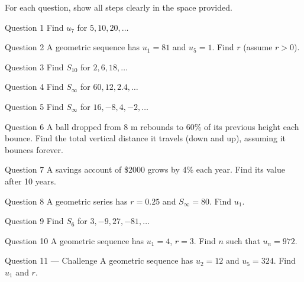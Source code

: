 \documentclass[11pt]{article}
\begin{document}
\clearpage
{}
For each question, show all steps clearly in the space provided.

\begin{qbox}{Question 1}
Find $u_7$ for $5,10,20,\dots$\workspace{2.4cm}
\end{qbox}

\begin{qbox}{Question 2}
A geometric sequence has $u_1=81$ and $u_5=1$. Find $r$ (assume $r>0$).\workspace{2.4cm}
\end{qbox}

\begin{qbox}{Question 3}
Find $S_{10}$ for $2,6,18,\dots$\workspace{2.4cm}
\end{qbox}

\begin{qbox}{Question 4}
Find $S_\infty$ for $60,12,2.4,\dots$\workspace{2.4cm}
\end{qbox}

\begin{qbox}{Question 5}
Find $S_\infty$ for $16,-8,4,-2,\dots$\workspace{2.4cm}
\end{qbox}

\begin{qbox}{Question 6}
A ball dropped from 8 m rebounds to 60\% of its previous height each bounce. Find the total vertical distance it travels (down and up), assuming it bounces forever.\workspace{2.4cm}
\end{qbox}

\begin{qbox}{Question 7}
A savings account of \$2000 grows by 4\% each year. Find its value after 10 years.\workspace{2.4cm}
\end{qbox}

\begin{qbox}{Question 8}
A geometric series has $r=0.25$ and $S_\infty=80$. Find $u_1$.\workspace{2.4cm}
\end{qbox}

\begin{qbox}{Question 9}
Find $S_6$ for $3,-9,27,-81,\dots$\workspace{2.4cm}
\end{qbox}

\begin{qbox}{Question 10}
A geometric sequence has $u_1=4$, $r=3$. Find $n$ such that $u_n=972$.\workspace{2.4cm}
\end{qbox}

\begin{qbox}{Question 11 --- Challenge}
A geometric sequence has $u_2=12$ and $u_5=324$. Find $u_1$ and $r$.\workspace{3.2cm}
\end{qbox}
\end{document}
